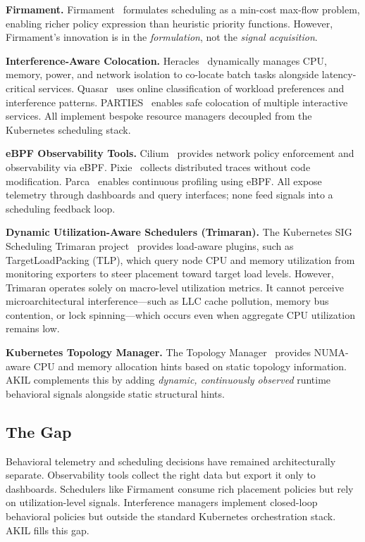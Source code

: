 \documentclass[10pt,conference,a4paper]{IEEEtran}
\begin{document}
\textbf{Firmament.}
Firmament~\cite{firmament2016} formulates scheduling as a min-cost max-flow problem,
enabling richer policy expression than heuristic priority functions. However,
Firmament's innovation is in the \emph{formulation}, not the \emph{signal acquisition}.

\textbf{Interference-Aware Colocation.}
Heracles~\cite{lo2015heracles} dynamically manages CPU, memory, power, and network
isolation to co-locate batch tasks alongside latency-critical services.
Quasar~\cite{delimitrou2014quasar} uses online classification of workload preferences
and interference patterns. PARTIES~\cite{parties2019} enables safe colocation of
multiple interactive services. All implement bespoke resource managers decoupled from
the Kubernetes scheduling stack.

\textbf{eBPF Observability Tools.}
Cilium~\cite{cilium} provides network policy enforcement and observability via eBPF.
Pixie~\cite{pixie2022} collects distributed traces without code modification.
Parca~\cite{parca2022} enables continuous profiling using eBPF. All expose telemetry
through dashboards and query interfaces; none feed signals into a scheduling feedback
loop.

\textbf{Dynamic Utilization-Aware Schedulers (Trimaran).}
The Kubernetes SIG Scheduling Trimaran project~\cite{trimaran2021} provides load-aware
plugins, such as TargetLoadPacking (TLP), which query node CPU and memory utilization from
monitoring exporters to steer placement toward target load levels. However, Trimaran operates
solely on macro-level utilization metrics. It cannot perceive microarchitectural
interference---such as LLC cache pollution, memory bus contention, or lock spinning---which
occurs even when aggregate CPU utilization remains low.

\textbf{Kubernetes Topology Manager.}
The Topology Manager~\cite{k8s_topology_manager} provides NUMA-aware CPU and memory
allocation hints based on static topology information. AKIL complements this by
adding \emph{dynamic, continuously observed} runtime behavioral signals alongside
static structural hints.

\subsection{The Gap}

Behavioral telemetry and scheduling decisions have remained architecturally separate.
Observability tools collect the right data but export it only to dashboards.
Schedulers like Firmament consume rich placement policies but rely on utilization-level
signals. Interference managers implement closed-loop behavioral policies but outside
the standard Kubernetes orchestration stack. AKIL fills this gap.
\end{document}
